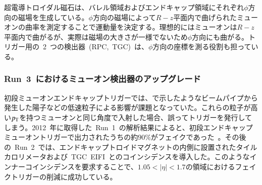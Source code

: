超電導トロイダル磁石は、バレル領域およびエンドキャップ領域にそれぞれ$\phi$方向の磁場を生成している。$\phi$方向の磁場によって$R-z$平面内で曲げられたミューオンの曲率を測定することで運動量を決定する。理想的にはミューオンは$R-z$平面内で曲がるが、実際は磁場の大きさが一様でないため$\phi$方向にも曲がる。トリガー用の~2~つの検出器~(RPC,~TGC)~は、$\phi$方向の座標を測る役割も担っている。

\subsubsection{Run~3~におけるミューオン検出器のアップグレード}
初段ミューオンエンドキャップトリガーでは、で示したようなビームパイプから発生した陽子などの低速粒子による影響が課題となっていた。これらの粒子が高い$p_{\rm{T}}$を持つミューオンと同じ角度で入射した場合、誤ってトリガーを発行してしまう。2012~年に取得した~Run~1~の解析結果によると、初段エンドキャップミューオントリガーで出力されたうちの約$90\%$がフェイクであった~\cite{TR:05}。その後の~Run~2~では、エンドキャップトロイドマグネットの内側に設置されたタイルカロリメータおよび~TGC~EIFI~とのコインシデンスを導入した。このようなインナーコインシデンスを要求することで、$1.05<|\eta|<1.7$の領域におけるフェイクトリガーの削減に成功している。

